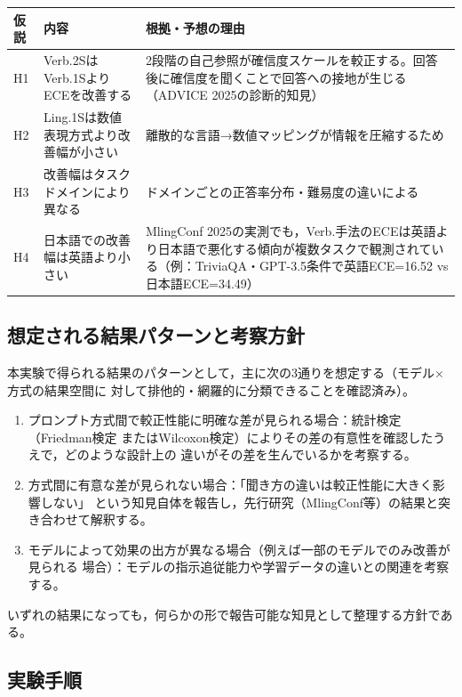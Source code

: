\documentclass[11pt,a4paper,oneside]{article}
\begin{document}
\begin{center}
\begin{tabular}{p{}p{}p{}}
\toprule
仮説 & 内容 & 根拠・予想の理由 \\
\midrule
H1 & Verb.2SはVerb.1SよりECEを改善する & 2段階の自己参照が確信度スケールを較正する。回答後に確信度を聞くことで回答への接地が生じる（ADVICE 2025の診断的知見） \\
H2 & Ling.1Sは数値表現方式より改善幅が小さい & 離散的な言語→数値マッピングが情報を圧縮するため \\
H3 & 改善幅はタスクドメインにより異なる & ドメインごとの正答率分布・難易度の違いによる \\
H4 & 日本語での改善幅は英語より小さい & MlingConf 2025の実測でも，Verb.手法のECEは英語より日本語で悪化する傾向が複数タスクで観測されている（例：TriviaQA・GPT-3.5条件で英語ECE=16.52 vs 日本語ECE=34.49） \\
\bottomrule
\end{tabular}
\end{center}

\subsection{想定される結果パターンと考察方針}

本実験で得られる結果のパターンとして，主に次の3通りを想定する（モデル×方式の結果空間に
対して排他的・網羅的に分類できることを確認済み）。

\begin{enumerate}
  \item[(a)] プロンプト方式間で較正性能に明確な差が見られる場合：統計検定（Friedman検定
        またはWilcoxon検定）によりその差の有意性を確認したうえで，どのような設計上の
        違いがその差を生んでいるかを考察する。
  \item[(b)] 方式間に有意な差が見られない場合：「聞き方の違いは較正性能に大きく影響しない」
        という知見自体を報告し，先行研究（MlingConf等）の結果と突き合わせて解釈する。
  \item[(c)] モデルによって効果の出方が異なる場合（例えば一部のモデルでのみ改善が見られる
        場合）：モデルの指示追従能力や学習データの違いとの関連を考察する。
\end{enumerate}

いずれの結果になっても，何らかの形で報告可能な知見として整理する方針である。

\subsection{実験手順}
\end{document}
